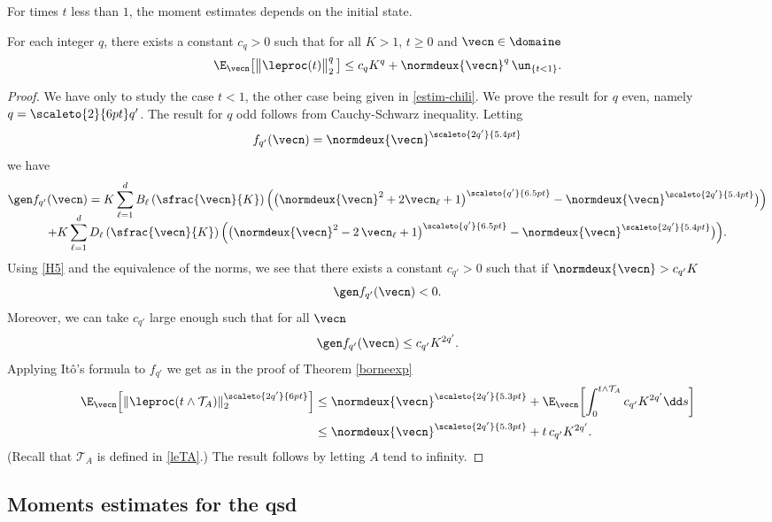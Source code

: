 For times $t$ less than $1$, the moment estimates depends on the initial state.
\begin{proposition}\label{tempscourts}
For each integer $q$, there exists a constant $c_{q}>0$ such that for all $K>1$, $t\geq 0$ and $\vecn\in \domaine$
\[
\E_{\vecn}\bigl[\big\|\leproc(t)\big\|^{q}_{2}\,\bigr]\le c_{q} K^{q}
+\normdeux{\vecn}^{q} \, \un_{\{t< 1\}}.
\]
\end{proposition}
\begin{proof} We have only to study the case $t< 1$, the other case being given in \eqref{estim-chili}.
We prove the result for $q$ even, namely $q=\scaleto{2}{6pt}q'$. The result for $q$ odd follows from Cauchy-Schwarz inequality.
Letting
\[
f_{q'}(\vecn)=\normdeux{\vecn}^{\scaleto{2q'}{5.4pt}}
\]
we have
\begin{multline*}
\gen f_{q'}(\vecn)=K\sum_{\ell=1}^{d}B_{\ell}\left(\sfrac{\vecn}{K}\right)\Bigl(\bigl(\normdeux{\vecn}^{2}+2\vecn_{\ell}+1\bigr)^{\scaleto{q'}{6.5pt}}-
\normdeux{\vecn}^{\scaleto{2q'}{5.4pt}}\bigr)\Bigr)\\[-8pt]
+K\sum_{\ell=1}^{d}D_{\ell}\left(\sfrac{\vecn}{K}\right)\Bigl(\bigl(\normdeux{\vecn}^{2}-2\,\vecn_{\ell}+1\bigr)^{\scaleto{q'}{6.5pt}}-
\normdeux{\vecn}^{\scaleto{2q'}{5.4pt}}\bigr)\Bigr).
\end{multline*}
Using \eqref{H5} and the equivalence of the norms, we see that there exists a constant $c_{q'}>0$ such that if
$\normdeux{\vecn}> c_{q'} K$
\[
\gen f_{q'}(\vecn)<0.
\]
Moreover, we can take $c_{q'}$ large enough such that for all $\vecn$
\[
\gen f_{q'}(\vecn)\le c_{q'} K^{2q'}.
\]
Applying Itô's formula to $f_{q'}$ we get as in the proof of Theorem
\ref{borneexp}
\begin{align*}
\E_{\vecn}\Bigl[\|\leproc(t\wedge \mathcal{T}_A)\|^{\scaleto{2q'}{6pt}}_{2}\Bigr]
& \le \normdeux{\vecn}^{\scaleto{2q'}{5.3pt}}+\E_{\vecn}\biggl[\int_{0}^{t\wedge \mathcal{T}_A} c_{q'} K^{2q'}\dd s\biggr]\\
& \le \normdeux{\vecn}^{\scaleto{2q'}{5.3pt}}+t\, c_{q'} K^{2q'}.
\end{align*}
(Recall that $\mathcal{T}_A$ is defined in \eqref{leTA}.)
The result follows by letting $A$ tend to infinity.
\end{proof}

\subsection{Moments estimates for the qsd}

